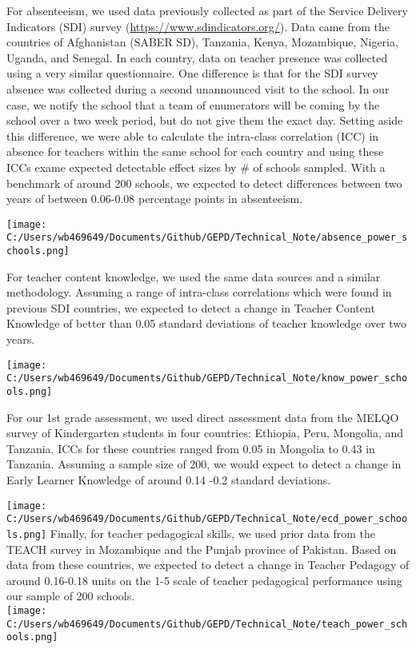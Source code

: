 \documentclass[]{article}
\begin{document}
For absenteeism, we used data previously collected as part of the
Service Delivery Indicators (SDI) survey
(\url{https://www.sdindicators.org/}). Data came from the countries of
Afghanistan (SABER SD), Tanzania, Kenya, Mozambique, Nigeria, Uganda,
and Senegal. In each country, data on teacher presence was collected
using a very similar questionnaire. One difference is that for the SDI
survey absence was collected during a second unannounced visit to the
school. In our case, we notify the school that a team of enumerators
will be coming by the school over a two week period, but do not give
them the exact day. Setting aside this difference, we were able to
calculate the intra-class correlation (ICC) in absence for teachers
within the same school for each country and using these ICCs exame
expected detectable effect sizes by \# of schools sampled. With a
benchmark of around 200 schools, we expected to detect differences
between two years of between 0.06-0.08 percentage points in absenteeism.

\texttt{[image: C:/Users/wb469649/Documents/Github/GEPD/Technical\_Note/absence\_power\_schools.png]}

For teacher content knowledge, we used the same data sources and a
similar methodology. Assuming a range of intra-class correlations which
were found in previous SDI countries, we expected to detect a change in
Teacher Content Knowledge of better than 0.05 standard deviations of
teacher knowledge over two years.

\texttt{[image: C:/Users/wb469649/Documents/Github/GEPD/Technical\_Note/know\_power\_schools.png]}

For our 1st grade assessment, we used direct assessment data from the
MELQO survey of Kindergarten students in four countries: Ethiopia, Peru,
Mongolia, and Tanzania. ICCs for these countries ranged from 0.05 in
Mongolia to 0.43 in Tanzania. Assuming a sample size of 200, we would
expect to detect a change in Early Learner Knowledge of around 0.14 -0.2
standard deviations.

\texttt{[image: C:/Users/wb469649/Documents/Github/GEPD/Technical\_Note/ecd\_power\_schools.png]}
Finally, for teacher pedagogical skills, we used prior data from the
TEACH survey in Mozambique and the Punjab province of Pakistan. Based on
data from these countries, we expected to detect a change in Teacher
Pedagogy of around 0.16-0.18 units on the 1-5 scale of teacher
pedagogical performance using our sample of 200 schools.\\
\texttt{[image: C:/Users/wb469649/Documents/Github/GEPD/Technical\_Note/teach\_power\_schools.png]}
\end{document}
